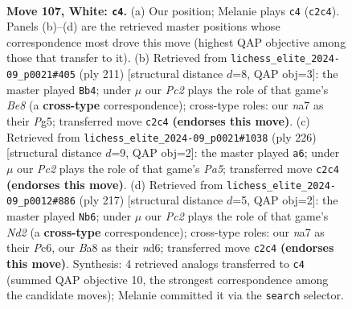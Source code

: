 \documentclass[11pt]{article}
\begin{document}
\clearpage

\begin{figure}[p]\centering
\begin{subfigure}{0.46\textwidth}\centering
\resizebox{\linewidth}{!}{%
\newchessgame
\chessboard[
  setfen={B7/n6k/8/6PK/8/7P/2P5/8 w - - 2 107},
  showmover=false,
  pgfstyle=straightmove, color=movearrow, markmove={c2-c4}
]}
\caption{}
\end{subfigure}\hfill
\begin{subfigure}{0.46\textwidth}\centering
\resizebox{\linewidth}{!}{%
\newchessgame
\chessboard[
  setfen={8/4k3/5p2/3K2p1/6B1/8/8/4b3 b - - 19 106},
  showmover=false,
  pgfstyle=straightmove, color=movearrow, markmove={e1-b4}
]}
\caption{}
\end{subfigure}
\\[4pt]
\begin{subfigure}{0.46\textwidth}\centering
\resizebox{\linewidth}{!}{%
\newchessgame
\chessboard[
  setfen={2k5/8/1P6/P1K5/8/2P5/8/8 w - - 1 114},
  showmover=false,
  pgfstyle=straightmove, color=movearrow, markmove={a5-a6}
]}
\caption{}
\end{subfigure}\hfill
\begin{subfigure}{0.46\textwidth}\centering
\resizebox{\linewidth}{!}{%
\newchessgame
\chessboard[
  setfen={8/3n4/k1pN4/p7/8/K7/8/8 b - - 25 109},
  showmover=false,
  pgfstyle=straightmove, color=movearrow, markmove={d7-b6}
]}
\caption{}
\end{subfigure}
\caption{\textbf{Move 107, White: \texttt{c4}.} (a) Our position; Melanie plays \texttt{c4} (\texttt{c2c4}). Panels (b)--(d) are the retrieved master positions whose correspondence most drove this move (highest QAP objective among those that transfer to it). (b) Retrieved from \texttt{lichess\_elite\_2024-09\_p0021\#405} (ply 211) [structural distance $d$=8, QAP obj=3]: the master played \texttt{Bb4}; under $\mu$ our \emph{Pc2} plays the role of that game's \emph{Be8} (a \textbf{cross-type} correspondence); cross-type roles: our \emph{n}a7 as their \emph{P}g5; transferred move \texttt{c2c4} \textbf{(endorses this move)}. (c) Retrieved from \texttt{lichess\_elite\_2024-09\_p0021\#1038} (ply 226) [structural distance $d$=9, QAP obj=2]: the master played \texttt{a6}; under $\mu$ our \emph{Pc2} plays the role of that game's \emph{Pa5}; transferred move \texttt{c2c4} \textbf{(endorses this move)}. (d) Retrieved from \texttt{lichess\_elite\_2024-09\_p0012\#886} (ply 217) [structural distance $d$=5, QAP obj=2]: the master played \texttt{Nb6}; under $\mu$ our \emph{Pc2} plays the role of that game's \emph{Nd2} (a \textbf{cross-type} correspondence); cross-type roles: our \emph{n}a7 as their \emph{P}c6, our \emph{B}a8 as their \emph{n}d6; transferred move \texttt{c2c4} \textbf{(endorses this move)}. Synthesis: 4 retrieved analogs transferred to \texttt{c4} (summed QAP objective 10, the strongest correspondence among the candidate moves); Melanie committed it via the \texttt{search} selector.}
\label{fig:thought-m212}
\end{figure}
\end{document}
